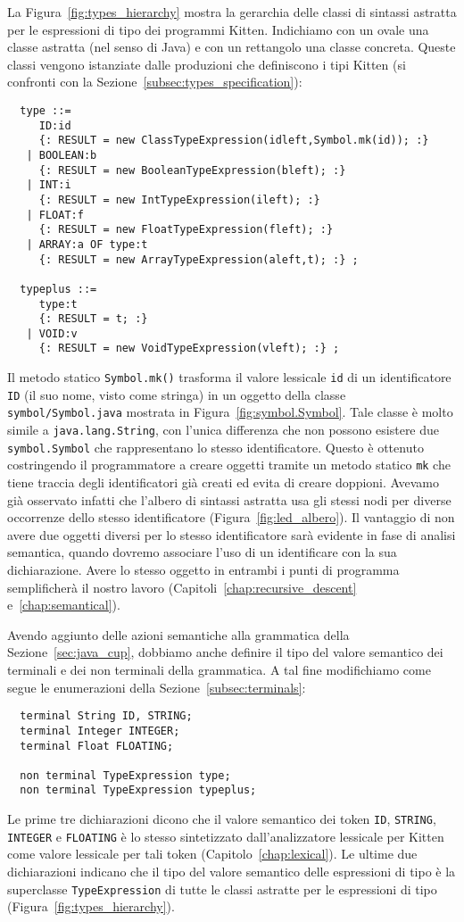 La Figura~\ref{fig:types_hierarchy} mostra la gerarchia delle classi di
sintassi astratta per le espressioni di tipo dei programmi Kitten.
Indichiamo con un ovale una classe astratta (nel senso di Java) e con
un rettangolo una classe concreta. Queste classi vengono istanziate
dalle produzioni che definiscono i tipi Kitten
(si confronti con la Sezione~\ref{subsec:types_specification}):
%
\begin{verbatim}
  type ::=
     ID:id
     {: RESULT = new ClassTypeExpression(idleft,Symbol.mk(id)); :}
   | BOOLEAN:b
     {: RESULT = new BooleanTypeExpression(bleft); :}
   | INT:i
     {: RESULT = new IntTypeExpression(ileft); :}
   | FLOAT:f
     {: RESULT = new FloatTypeExpression(fleft); :}
   | ARRAY:a OF type:t
     {: RESULT = new ArrayTypeExpression(aleft,t); :} ;

  typeplus ::=
     type:t
     {: RESULT = t; :}
   | VOID:v
     {: RESULT = new VoidTypeExpression(vleft); :} ;
\end{verbatim}
%
Il metodo statico \texttt{Symbol.mk()} trasforma il valore lessicale
\texttt{id} di un identificatore \texttt{ID} (\cioe il suo
nome, visto come stringa) in un oggetto della classe
\texttt{symbol/Symbol.java} mostrata in
Figura~\ref{fig:symbol.Symbol}. Tale classe \`e molto simile a
\texttt{java.lang.String}, con l'unica differenza che non
possono esistere due \texttt{symbol.Symbol} che rappresentano lo
stesso identificatore. Questo \`e ottenuto costringendo il programmatore
a creare oggetti tramite un metodo statico \texttt{mk} che tiene traccia
degli identificatori gi\`a creati ed evita di creare doppioni.
Avevamo gi\`a osservato infatti che l'albero di sintassi astratta
usa gli stessi nodi per diverse occorrenze dello stesso identificatore
(Figura~\ref{fig:led_albero}).
Il vantaggio di non avere due oggetti diversi per lo stesso identificatore
sar\`a evidente in fase di analisi semantica, quando dovremo associare
l'uso di un identificare con la sua dichiarazione. Avere lo stesso oggetto
in entrambi i punti di programma semplificher\`a il nostro lavoro
(Capitoli~\ref{chap:recursive_descent} e~\ref{chap:semantical}).

Avendo aggiunto delle azioni semantiche alla grammatica della
Sezione~\ref{sec:java_cup}, dobbiamo anche definire il tipo del valore
semantico dei terminali e dei non terminali della grammatica.
A tal fine modifichiamo come segue le
enumerazioni della Sezione~\ref{subsec:terminals}:
%
\begin{verbatim}
  terminal String ID, STRING;
  terminal Integer INTEGER;
  terminal Float FLOATING;

  non terminal TypeExpression type;
  non terminal TypeExpression typeplus;
\end{verbatim}
%
Le prime tre dichiarazioni dicono che il valore semantico dei token
\texttt{ID}, \texttt{STRING}, \texttt{INTEGER} e \texttt{FLOATING}
\`e lo stesso sintetizzato dall'analizzatore lessicale per Kitten
come valore lessicale per tali token (Capitolo~\ref{chap:lexical}).
Le ultime due dichiarazioni indicano che
il tipo del valore semantico delle espressioni di tipo \`e
la superclasse \texttt{TypeExpression} di tutte le classi astratte per
le espressioni di tipo (Figura~\ref{fig:types_hierarchy}).
%

